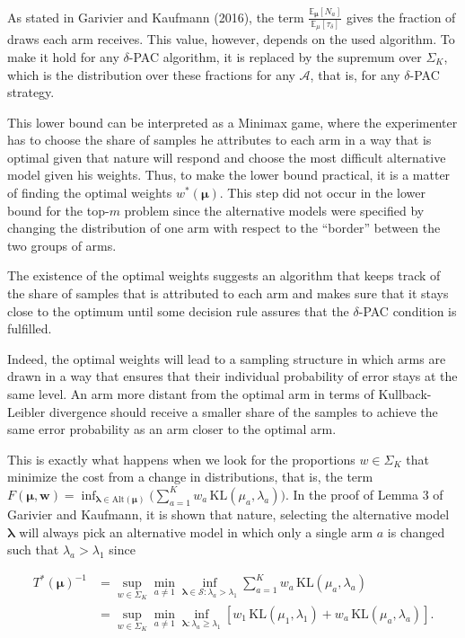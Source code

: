 \documentclass[11pt,]{article}
\newcommand{\KL}{\,\text{KL}}
\begin{document}
As stated in Garivier and Kaufmann (2016), the term
\(\frac{\mathbb{E}_{\bm{\mu}}[N_a]}{\mathbb{E}_{\mu}[\tau_{\delta}]}\)
gives the fraction of draws each arm receives. This value, however,
depends on the used algorithm. To make it hold for any \(\delta\)-PAC
algorithm, it is replaced by the supremum over \(\Sigma_K\), which is
the distribution over these fractions for any \(\mathcal{A}\), that is,
for any \(\delta\)-PAC strategy.

This lower bound can be interpreted as a Minimax game, where the
experimenter has to choose the share of samples he attributes to each
arm in a way that is optimal given that nature will respond and choose
the most difficult alternative model given his weights. Thus, to make
the lower bound practical, it is a matter of finding the optimal weights
\(w^*(\bm{\mu})\). This step did not occur in the lower bound for the
top-\(m\) problem since the alternative models were specified by
changing the distribution of one arm with respect to the ``border''
between the two groups of arms.

The existence of the optimal weights suggests an algorithm that keeps
track of the share of samples that is attributed to each arm and makes
sure that it stays close to the optimum until some decision rule assures
that the \(\delta\)-PAC condition is fulfilled.

Indeed, the optimal weights will lead to a sampling structure in which
arms are drawn in a way that ensures that their individual probability
of error stays at the same level. An arm more distant from the optimal
arm in terms of Kullback-Leibler divergence should receive a smaller
share of the samples to achieve the same error probability as an arm
closer to the optimal arm.

This is exactly what happens when we look for the proportions
\(w \in \Sigma_K\) that minimize the cost from a change in
distributions, that is, the term
\(F(\bm{\mu}, \bm{w}) = \inf_{\bm{\lambda} \in \text{Alt}(\bm{\mu})} \Big(\sum_{a= 1}^K w_a \KL(\mu_a, \lambda_a)\Big)\).
In the proof of Lemma 3 of Garivier and Kaufmann, it is shown that
nature, selecting the alternative model \(\bm{\lambda}\) will always
pick an alternative model in which only a single arm \(a\) is changed
such that \(\lambda_a > \lambda_1\) since

\begin{align*}
T^*(\bm{\mu})^{-1} & = \sup_{w \in \Sigma_K} \min_{a \neq 1} \inf_{\bm{\lambda} \in \mathcal{S}: \lambda_a > \lambda_1} \sum_{a=1}^K w_a \KL(\mu_a, \lambda_a)  \\
& = \sup_{w \in \Sigma_K} \min_{a \neq 1} \inf_{\bm{\lambda}: \lambda_a \geq \lambda_1} [w_1 \KL(\mu_1, \lambda_1)+w_a \KL(\mu_a, \lambda_a)].
\end{align*}
\end{document}
